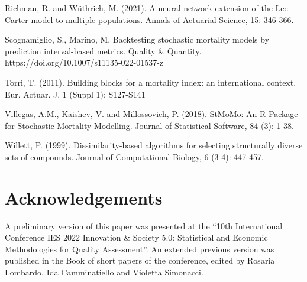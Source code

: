 \documentclass[a4,11pt]{article}
\begin{document}
\begin{thebibliography}{99}
Richman, R. and W\"uthrich, M. (2021). A neural network extension of the Lee-Carter model to multiple populations. Annals of Actuarial Science, 15: 346-366.

Scognamiglio, S., Marino, M. Backtesting stochastic mortality models by prediction interval-based metrics. Quality \& Quantity. https://doi.org/10.1007/s11135-022-01537-z

Torri, T. (2011). Building blocks for a mortality index: an international context. Eur. Actuar. J. 1 (Suppl 1): S127-S141

Villegas, A.M., Kaishev, V. and Millossovich, P. (2018). StMoMo: An R Package for Stochastic Mortality Modelling. Journal of Statistical Software, 84 (3): 1-38.

Willett, P. (1999). Dissimilarity-based algorithms for selecting structurally diverse sets of compounds. Journal of Computational Biology, 6 (3-4): 447-457.
 
\end{thebibliography}

\section*{Acknowledgements}
\color{red}A preliminary version of this paper was presented at the “10th International Conference IES 2022 Innovation \& Society 5.0: Statistical and Economic Methodologies for Quality Assessment”. An extended previous version was published in the Book of short papers of the conference, edited by Rosaria Lombardo, Ida Camminatiello and Violetta Simonacci. \color{black}
\end{document}
